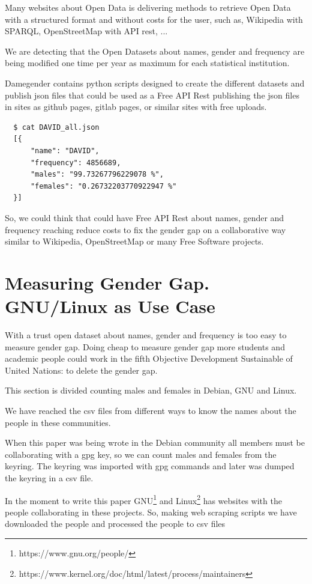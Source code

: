 \documentclass[a4paper]{article}
\begin{document}
Many websites about Open Data is delivering methods to retrieve Open
Data with a structured format and without costs for the user, such as,
Wikipedia with SPARQL, OpenStreetMap with API rest, ...

We are detecting that the Open Datasets about names, gender and
frequency are being modified one time per year as maximum for each
statistical institution.

Damegender contains python scripts designed to create the
different datasets and publish json files that could be used as a Free
API Rest publishing the json files in sites as github pages, gitlab
pages, or similar sites with free uploads.

\begin{verbatim}
  $ cat DAVID_all.json
  [{
      "name": "DAVID",
      "frequency": 4856689,
      "males": "99.73267796229078 %",
      "females": "0.26732203770922947 %"
  }]
\end{verbatim}

So, we could think that could have Free API Rest about names, gender
and frequency reaching reduce costs to fix the gender gap on a
collaborative way similar to Wikipedia, OpenStreetMap or many Free
Software projects.

\section{Measuring Gender Gap. GNU/Linux as Use Case}
\label{sec:measuring}

With a trust open dataset about names, gender and frequency is too
easy to measure gender gap. Doing cheap to measure gender gap more
students and academic people could work in the fifth Objective
Development Sustainable of United Nations: to delete the gender gap.

This section is divided counting males and females in Debian, GNU and
Linux.

We have reached the csv files from different ways to know the names
about the people in these communities.

When this paper was being wrote in the Debian community all members
must be collaborating with a gpg key, so we can count males and females
from the keyring. The keyring was imported with gpg commands and later
was dumped the keyring in a csv file.

In the moment to write this paper
GNU\footnote{https://www.gnu.org/people/} and
Linux\footnote{https://www.kernel.org/doc/html/latest/process/maintainers}
has websites with the people collaborating in these projects. So,
making web scraping scripts we have downloaded the people and processed
the people to csv files
\end{document}
